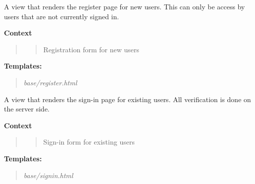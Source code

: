\documentclass[letterpaper,10pt,english]{sphinxmanual}
\begin{document}

\begin{fulllineitems}
\label{modules/home:home.views.index}
\end{fulllineitems}


\begin{fulllineitems}
\label{modules/home:home.views.register}
A view that renders the register page for new users. This can only
be access by users that are not currently signed in.

\textbf{Context}
\begin{quote}

\begin{quote}

Registration form for new users
\end{quote}
\end{quote}

\textbf{Templates:}
\begin{quote}

\emph{base/register.html}
\end{quote}

\end{fulllineitems}


\begin{fulllineitems}
\label{modules/home:home.views.signin}
A view that renders the sign-in page for existing users. All
verification is done on the server side.

\textbf{Context}
\begin{quote}

\begin{quote}

Sign-in form for existing users
\end{quote}
\end{quote}

\textbf{Templates:}
\begin{quote}

\emph{base/signin.html}
\end{quote}

\end{fulllineitems}
\end{document}
